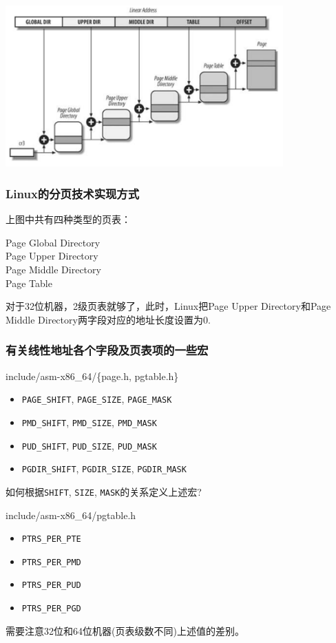 \documentclass[xcolor=svgnames]{beamer}
\begin{document}
\begin{CJK*}{UTF8}{gbsn}
\begin{frame}[fragile]
\includegraphics[width=0.8\textwidth]{linuxpaging.png}
\end{frame}

\begin{frame}[fragile]
\frametitle{Linux的分页技术实现方式}
上图中共有四种类型的页表：
\begin{description}
\item[Page Global Directory]
\item[Page Upper Directory]
\item[Page Middle Directory]
\item[Page Table]
\end{description}
对于32位机器，2级页表就够了，此时，Linux把Page Upper Directory和Page Middle Directory两字段对应的地址长度设置为0.

\end{frame}

\begin{frame}[fragile]
\frametitle{有关线性地址各个字段及页表项的一些宏}
\begin{block}{include/asm-x86\_64/\{page.h, pgtable.h\}}
\begin{itemize}
\item \verb|PAGE_SHIFT|, \verb|PAGE_SIZE|, \verb|PAGE_MASK|
\item \verb|PMD_SHIFT|, \verb|PMD_SIZE|, \verb|PMD_MASK|
\item \verb|PUD_SHIFT|, \verb|PUD_SIZE|, \verb|PUD_MASK|
\item \verb|PGDIR_SHIFT|, \verb|PGDIR_SIZE|, \verb|PGDIR_MASK|
\end{itemize}
如何根据\verb|SHIFT|, \verb|SIZE|, \verb|MASK|的关系定义上述宏?
\end{block}
\begin{block}{include/asm-x86\_64/pgtable.h}
\begin{itemize}
\item \verb|PTRS_PER_PTE|
\item \verb|PTRS_PER_PMD|
\item \verb|PTRS_PER_PUD|
\item \verb|PTRS_PER_PGD|
\end{itemize}
需要注意32位和64位机器(页表级数不同)上述值的差别。
\end{block}
\end{frame}



\end{CJK*}
\end{document}
